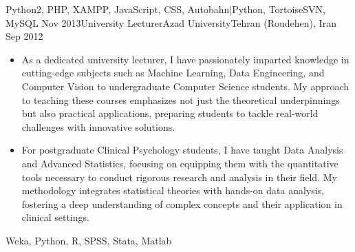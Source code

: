 \begin{experiences}
{\begin{itemize}
		\end{itemize}
	}
	{Python2, PHP, XAMPP, JavaScript, CSS, Autobahn|Python, TortoiseSVN, MySQL}
	\emptySeparator
	\experience
	{Nov 2013}{University Lecturer}{Azad University}{Tehran (Roudehen), Iran}
	{Sep 2012} {
		\begin{itemize}
			\item As a dedicated university lecturer, I have passionately imparted knowledge in cutting-edge subjects such as Machine Learning, Data Engineering, and Computer Vision to undergraduate Computer Science students. My approach to teaching these courses emphasizes not just the theoretical underpinnings but also practical applications, preparing students to tackle real-world challenges with innovative solutions.

			\item For postgraduate Clinical Psychology students, I have taught Data Analysis and Advanced Statistics, focusing on equipping them with the quantitative tools necessary to conduct rigorous research and analysis in their field. My methodology integrates statistical theories with hands-on data analysis, fostering a deep understanding of complex concepts and their application in clinical settings.

		\end{itemize}
	}
	{Weka, Python, R, SPSS, Stata, Matlab}
\end{experiences}
